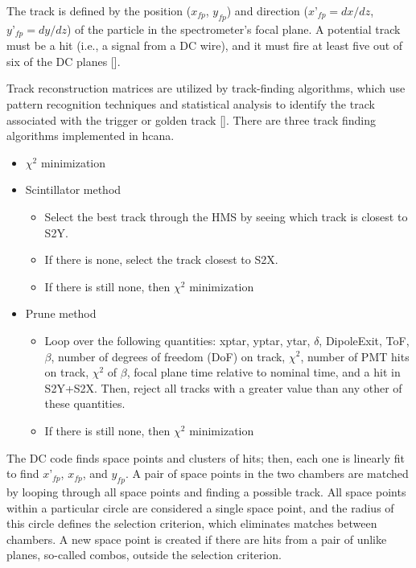 \documentclass[
]{report}
\begin{document}
The track is defined by the position (\(x_{fp}\), \(y_{fp}\)) and
direction (\(x’_{fp}=dx/dz\), \(y’_{fp}=dy/dz\)) of the particle in the
spectrometer's focal plane. A potential track must be a hit (i.e., a
signal from a DC wire), and it must fire at least five out of six of the
DC planes {[}\cite{usman_shms_2022}{]}.

Track reconstruction matrices are utilized by track-finding algorithms,
which use pattern recognition techniques and statistical analysis to
identify the track associated with the trigger or golden track
{[}\cite{jones_track_2020}{]}. There are three track finding algorithms
implemented in hcana.

\begin{itemize}
  \item $\chi^2$ minimization
  \item Scintillator method
    \begin{itemize}
      \item Select the best track through the HMS by seeing which track is closest to S2Y. 
      \item If there is none, select the track closest to S2X.
      \item If there is still none, then $\chi^2$ minimization
    \end{itemize}
  \item Prune method
    \begin{itemize}
      \item Loop over the following quantities: xptar, yptar, ytar, $\delta$, DipoleExit, ToF, $\beta$, number of degrees of freedom (DoF) on track, $\chi^2$, number of PMT hits on track, $\chi^2$ of $\beta$, focal plane time relative to nominal time, and a hit in S2Y+S2X. Then, reject all tracks with a greater value than any other of these quantities.
      \item If there is still none, then $\chi^2$ minimization
    \end{itemize}
\end{itemize}

The DC code finds space points and clusters of hits; then, each one is
linearly fit to find \(x’_{fp}\), \(x_{fp}\), and \(y_{fp}\). A pair of
space points in the two chambers are matched by looping through all
space points and finding a possible track. All space points within a
particular circle are considered a single space point, and the radius of
this circle defines the selection criterion, which eliminates matches
between chambers. A new space point is created if there are hits from a
pair of unlike planes, so-called combos, outside the selection
criterion.
\end{document}
